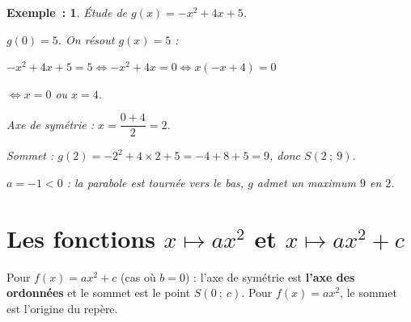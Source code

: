 \documentclass[12pt]{article}
\theoremstyle{break}
\newtheorem*{example}{Exemple~:}
\theoremstyle{inline}
\begin{document}
\begin{example}
  \begin{minipage}[t]{0.62\linewidth}
    \vspace{0pt}
    Étude de $g(x) = -x^2 + 4x + 5$.
    \begin{multihideW}[0.5em]
      $g(0) = 5$. On résout $g(x) = 5$ :

      $-x^2 + 4x + 5 = 5 \iff -x^2 + 4x = 0 \iff x(-x + 4) = 0$

      $\iff x = 0$ ou $x = 4$.

      Axe de symétrie : $x = \dfrac{0 + 4}{2} = 2$.

      Sommet : $g(2) = -2^2 + 4 \times 2 + 5 = -4 + 8 + 5 = 9$, donc $S(2~;~9)$.

      $a = -1 < 0$ : la parabole est tournée vers le bas, $g$ admet un maximum $9$ en $2$.

      \smallskip
    \end{multihideW}
  \end{minipage}
  \hfill
  \begin{minipage}[t]{0.35\linewidth}
    \vspace{0pt}
    \centering
  \end{minipage}
\end{example}

\newpage
\section{Les fonctions $x \mapsto ax^2$ et $x \mapsto ax^2 + c$}

\begin{proposition}{}{}
  \begin{multihide}
    Pour $f(x) = ax^2 + c$ (cas où $b = 0$) : l'axe de symétrie est \textbf{l'axe des ordonnées} et le sommet est le point $S(0~;~c)$. Pour $f(x) = ax^2$, le sommet est l'origine du repère.
  \end{multihide}
\end{proposition}
\end{document}
